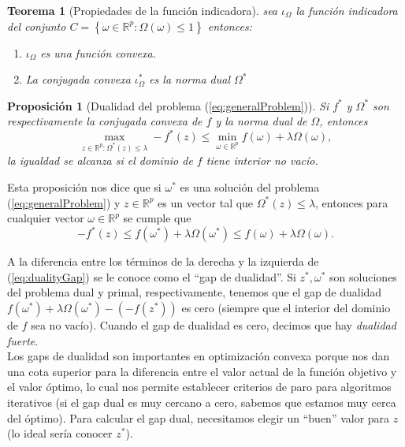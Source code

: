 \documentclass[12pt,draftcls, onecolumn, letterpaper,compsoc]{IEEEtran}
\newtheorem{proposition}{\textbf{Proposici\'{o}n}}
\newtheorem{theorem}{\textbf{Teorema}}
\begin{document}
\begin{theorem}[Propiedades de la funci\'{o}n indicadora]
    sea $\iota_{\Omega}$ la funci\'{o}n indicadora del conjunto $C =\left\lbrace \omega\in \mathbb{R}^{p} : \Omega(\omega)\leq 1\right\rbrace$ entonces:
    \begin{enumerate}
        \item{$\iota_{\Omega}$ es una funci\'{o}n convexa.}
        \item{La conjugada convexa $\iota^{*}_{\Omega}$ es la norma dual $\Omega^{*}$}
    \end{enumerate}
\end{theorem}

\begin{proposition}[Dualidad del problema (\ref{eq:generalProblem})]
    Si $f^{*}$ y $\Omega^{*}$ son respectivamente la conjugada convexa de $f$ y la norma dual de $\Omega$, entonces
    \begin{displaymath}
        \max_{z\in \mathbb{R}^{p}: \Omega^{*}(z)\leq \lambda} -f^{*}(z) \leq \min_{\omega \in \mathbb{R}^{p}} f(\omega) + \lambda \Omega(\omega),
    \end{displaymath}
    la igualdad se alcanza si el dominio de $f$ tiene interior no vac\'{i}o.
\end{proposition}

Esta proposici\'{o}n nos dice que si $\omega^{*}$ es una soluci\'{o}n del problema (\ref{eq:generalProblem}) y $z\in \mathbb{R}^{p}$ es un vector tal que $\Omega^{*}(z)\leq\lambda$, entonces para cualquier vector $\omega \in \mathbb{R}^{p}$ se cumple que
\begin{equation}\label{eq:dualityGap}
    -f^{*}(z) \leq f(\omega^{*})+ \lambda\Omega(\omega^{*})\leq f(\omega) + \lambda\Omega(\omega).
\end{equation}

A la diferencia entre los t\'{e}rminos de la derecha y la izquierda de (\ref{eq:dualityGap}) se le conoce como el ``gap de dualidad''. Si $z^{*}, \omega^{*}$ son soluciones del problema dual y primal, respectivamente, tenemos que el gap de dualidad $f(\omega^{*}) + \lambda\Omega(\omega^{*}) - (-f(z^{*}))$ es cero (siempre que el interior del dominio de $f$ sea no vac\'{i}o). Cuando el gap de dualidad es cero, decimos que hay {\it dualidad fuerte}.\\

Los gaps de dualidad son importantes en optimizaci\'{o}n convexa porque nos dan una cota superior para la diferencia entre el valor actual de la funci\'{o}n objetivo y el valor \'{o}ptimo, lo cual nos permite establecer criterios de paro para algoritmos iterativos (si el gap dual es muy cercano a cero, sabemos que estamos muy cerca del \'{o}ptimo). Para calcular el gap dual, necesitamos elegir un ``buen'' valor para $z$ (lo ideal ser\'{i}a conocer $z^{*}$).\\
\end{document}
